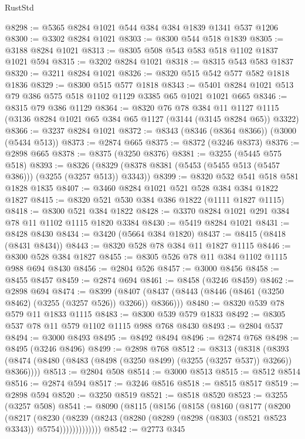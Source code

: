 \begin{lexlean}{RustStd}
\begin{coremodule}
@8298 := @5365 @8284 @1021 @544 @384 @384 @1839 @1341 @537 @1206
@8300 := @3302 @8284 @1021
@8303 := @8300 @544 @518 @1839
@8305 := @3188 @8284 @1021
@8313 := @8305 @508 @543 @583 @518 @1102 @1837 @1021 @594
@8315 := @3202 @8284 @1021
@8318 := @8315 @543 @583 @1837
@8320 := @3211 @8284 @1021
@8326 := @8320 @515 @542 @577 @582 @1818 @1836
@8329 := @8300 @515 @577 @1818
@8343 := @5401 @8284 @1021 @513 @79 @386 @575 @518 @1102 @1129 @3385 @65 @1021 @1021 @665
@8346 := @8315 @79 @386 @1129
@8364 := @8320
    @76
    @78
    @384
    @11
    @1127
    @1115
    (@3136 @8284 @1021 @65 @384 @65 @1127 (@3144 (@3145 @8284 @65)) @3322)
@8366 := @3237 @8284 @1021
@8372 := @8343 (@8346 (@8364 @8366)) (@3000 (@5434 @513))
@8373 := @2874 @665
@8375 := @8372 (@3246 @8373)
@8376 := @2898 @665
@8378 := @8375 (@3250 @8376)
@8381 := @3255 (@5445 @575 @518)
@8393 := @8326 (@8329 (@8378 @8381 (@5453 (@5455 @513 (@5457 @386))) (@3255 (@3257 @513)) @3343))
@8399 := @8320 @532 @541 @518 @581 @1828 @1835
@8407 := @3460 @8284 @1021 @521 @528 @384 @384 @1822 @1827
@8415 := @8320 @521 @530 @384 @386 @1822 (@1111 @1827 @1115)
@8418 := @8300 @521 @384 @1822
@8428 := @3370 @8284 @1021 @291 @384 @78 @11 @1102 @1115 @1820 @3384
@8430 := @5419 @8284 @1021
@8431 := @8428 @8430
@8434 := @3420 (@5664 @384 @1820)
@8437 := @8415 (@8418 (@8431 @8434))
@8443 := @8320 @528 @78 @384 @11 @1827 @1115
@8446 := @8300 @528 @384 @1827
@8455 := @8305 @526 @78 @11 @384 @1102 @1115 @988 @694 @8430
@8456 := @2804 @526
@8457 := @3000 @8456
@8458 := @8455 @8457
@8459 := @2874 @694
@8461 := @8458 (@3246 @8459)
@8462 := @2898 @694
@8474 := @8399
    (@8407 (@8437 (@8443 (@8446 (@8461 (@3250 @8462) (@3255 (@3257 @526)) @3266)) @8366)))
@8480 := @8320 @539 @78 @579 @11 @1833 @1115
@8483 := @8300 @539 @579 @1833
@8492 := @8305 @537 @78 @11 @579 @1102 @1115 @988 @768 @8430
@8493 := @2804 @537
@8494 := @3000 @8493
@8495 := @8492 @8494
@8496 := @2874 @768
@8498 := @8495 (@3246 @8496)
@8499 := @2898 @768
@8512 := @8313
    (@8318 (@8393 (@8474 (@8480 (@8483 (@8498 (@3250 @8499) (@3255 (@3257 @537)) @3266)) @8366))))
@8513 := @2804 @508
@8514 := @3000 @8513
@8515 := @8512 @8514
@8516 := @2874 @594
@8517 := @3246 @8516
@8518 := @8515 @8517
@8519 := @2898 @594
@8520 := @3250 @8519
@8521 := @8518 @8520
@8523 := @3255 (@3257 @508)
@8541 := @8090
    (@8115
      (@8156
        (@8158
          (@8160
            (@8177
              (@8200
                (@8217
                  (@8230
                    (@8239
                      (@8243 (@8280 (@8289 (@8298 (@8303 (@8521 @8523 @3343)) @5754)))))))))))))
@8542 := @2773 @345

\end{coremodule}
\end{lexlean}
